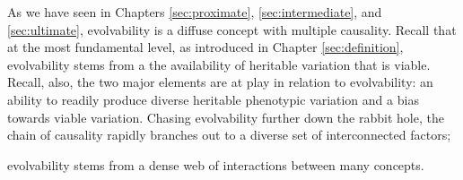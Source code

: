 As we have seen in Chapters \ref{sec:proximate}, \ref{sec:intermediate}, and \ref{sec:ultimate}, evolvability is a diffuse concept with multiple causality.
Recall that at the most fundamental level, as introduced in Chapter \ref{sec:definition}, evolvability stems from a the availability of heritable variation that is viable.
Recall, also, the two major elements are at play in relation to evolvability: an ability to readily produce diverse heritable phenotypic variation and a bias towards viable variation.
Chasing evolvability further down the rabbit hole, the chain of causality rapidly branches out to a diverse set of interconnected factors;

% 

evolvability stems from a dense web of interactions between many concepts.
 
